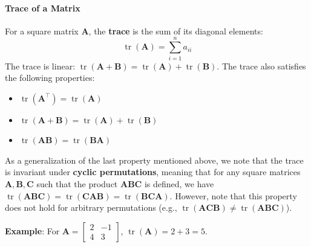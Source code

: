 \paragraph*{Trace of a Matrix}
For a square matrix $ \mathbf{A} $, the \textbf{trace} is the sum of its diagonal elements:
\begin{equation*}
    \operatorname{tr}(\mathbf{A}) = \sum_{i=1}^n a_{ii}
\end{equation*}
The trace is linear: $ \operatorname{tr}(\mathbf{A} + \mathbf{B}) = \operatorname{tr}(\mathbf{A}) + \operatorname{tr}(\mathbf{B}) $.
The trace also satisfies the following properties:
\begin{itemize}
\item $ \operatorname{tr}(\mathbf{A}^\top) = \operatorname{tr}(\mathbf{A}) $
\item $ \operatorname{tr}(\mathbf{A} + \mathbf{B}) = \operatorname{tr}(\mathbf{A}) + \operatorname{tr}(\mathbf{B}) $
\item $ \operatorname{tr}(\mathbf{AB}) = \operatorname{tr}(\mathbf{BA}) $
\end{itemize}

\begin{optionalBox}
As a generalization of the last property mentioned above, we note that the trace is invariant under \textbf{cyclic permutations}, meaning that for any square matrices $ \mathbf{A}, \mathbf{B}, \mathbf{C} $ such that the product $ \mathbf{ABC} $ is defined, we have $ \operatorname{tr}(\mathbf{ABC}) = \operatorname{tr}(\mathbf{CAB}) = \operatorname{tr}(\mathbf{BCA}) $. However, note that this property does not hold for arbitrary permutations (e.g., $ \operatorname{tr}(\mathbf{ACB}) \neq \operatorname{tr}(\mathbf{ABC}) $).
\end{optionalBox}

\begin{exampleBox}
    \textbf{Example}: For $ \mathbf{A} = \begin{bmatrix}2 & -1\\4 & 3\end{bmatrix} $, $ \operatorname{tr}(\mathbf{A}) = 2 + 3 = 5 $.
\end{exampleBox}

